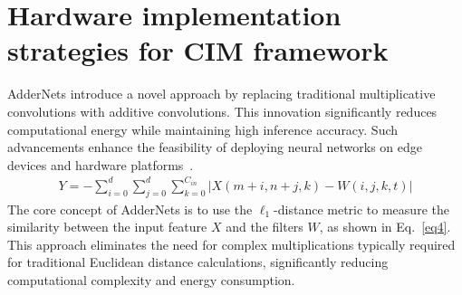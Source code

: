 \documentclass[submit]{elex2024}%
\begin{document}
\section{Hardware implementation strategies for CIM framework}
AdderNets introduce a novel approach by replacing traditional multiplicative convolutions with additive convolutions. This innovation significantly reduces computational energy while maintaining high inference accuracy. Such advancements enhance the feasibility of deploying neural networks on edge devices and hardware platforms~\cite{29}.
\begin{equation}
    \begin{aligned}
        Y=-\sum_{i=0}^{d}\sum_{j=0}^{d}\sum_{k=0}^{C_{in}}\left|X\left(m+i,n+j,k\right)-W\left(i,j,k,t\right)\right|
    \label{eq4}
    \end{aligned}
\end{equation}
The core concept of AdderNets is to use the $\ell_1$-distance metric to measure the similarity between the input feature $X$ and the filters $W$, as shown in Eq.~\ref{eq4}. This approach eliminates the need for complex multiplications typically required for traditional Euclidean distance calculations, significantly reducing computational complexity and energy consumption.
\end{document}

